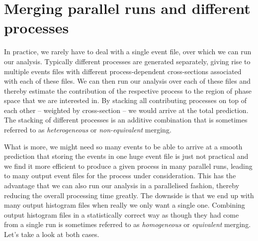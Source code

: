\documentclass[10pt,fleqn]{scrartcl}
\theoremstyle{exstyle}
\begin{document}
%
%

\section{Merging parallel runs and different processes}

In practice, we rarely have to deal with a single event file,
over which we can run our analysis. Typically different processes
are generated separately, giving rise to multiple events files
with different process-dependent cross-sections associated with
each of these files. We can then run our analysis over each of
these files and thereby estimate the contribution of the respective
process to the region of phase space that we are interested in.
By stacking all contributing processes on top of each other
-- weighted by cross-section -- we would arrive at the total prediction.
The stacking of different processes is an additive combination that is
sometimes referred to as \emph{heterogeneous} or \emph{non-equivalent} merging.

What is more, we might need so many events
to be able to arrive at a smooth prediction that storing
the events in one huge event file is just not practical
and we find it more efficient to produce a given process
in many parallel runs, leading to many output event files
for the process under consideration.
This has the advantage that we can also run our analysis
in a parallelised fashion, thereby reducing the overall
processing time greatly.
The downside is that we end up with many output histogram
files when really we only want a single one. Combining output
histogram files in a statistically correct way as though
they had come from a single run is sometimes referred to
as \emph{homogeneous} or \emph{equivalent} merging.
Let's take a look at both cases.
\end{document}
